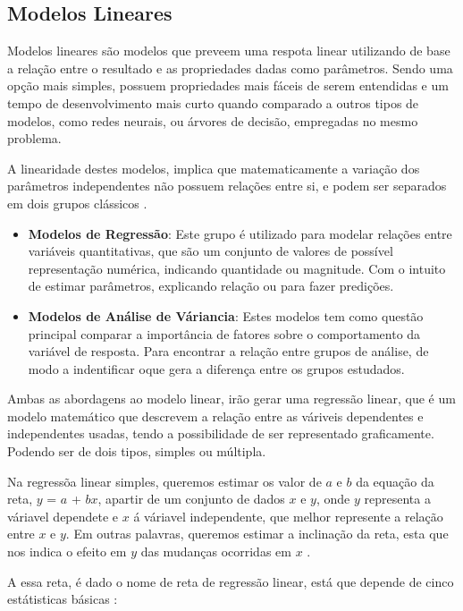 \documentclass[
	12pt,				%
	openright,			%
	oneside,			%
	a4paper,			%
	english,			%
	brazil				%
	]{abntex2}
\begin{document}

\subsection{Modelos Lineares}

Modelos lineares são modelos que preveem uma respota linear utilizando de base a relação entre o resultado
e as propriedades dadas como parâmetros. Sendo uma opção mais simples, possuem propriedades mais fáceis de
serem entendidas e um tempo de desenvolvimento mais curto quando comparado a outros tipos de modelos,
como redes neurais, ou árvores de decisão, empregadas no mesmo problema. \cite{modelos_lineares}

A linearidade destes modelos, implica que matematicamente a variação dos parâmetros independentes não
possuem relações entre si, e podem ser separados em dois grupos clássicos \cite{tipos_modelos_lineares}.
\begin{itemize}
	\item \textbf{Modelos de Regressão}:
	Este grupo é utilizado para modelar relações entre variáveis quantitativas, que são um conjunto de
	valores de possível representação numérica, indicando quantidade ou magnitude. Com o intuito de estimar
	parâmetros, explicando relação ou para fazer predições.
	\item \textbf{Modelos de Análise de Váriancia}:
	Estes modelos tem como questão principal comparar a importância de fatores sobre o comportamento da
	variável de resposta. Para encontrar a relação entre grupos de análise, de modo a indentificar oque
	gera a diferença entre os grupos estudados.
\end{itemize}

Ambas as abordagens ao modelo linear, irão gerar uma regressão linear, que é um modelo matemático que 
descrevem a relação entre as váriveis dependentes e independentes usadas, tendo a possibilidade de ser
representado graficamente. Podendo ser de dois tipos, simples ou múltipla.

Na regressõa linear simples, queremos estimar os valor de $a$ e $b$ da equação da reta, $y$ = $a$ + $bx$, 
apartir de um conjunto de dados $x$ e $y$, onde $y$ representa a váriavel dependete e $x$ á váriavel 
independente, que melhor represente a relação entre $x$ e $y$. Em outras palavras, queremos estimar a 
inclinação da reta, esta que nos indica o efeito em $y$ das mudanças ocorridas em $x$ 
\cite{modelos_regressao_linear}.

A essa reta, é dado o nome de reta de regressão linear, está que depende de cinco estátisticas básicas
\cite{modelos_regressao_linear}:
\end{document}
